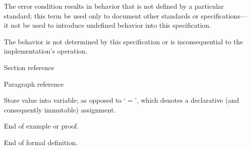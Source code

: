 \begin{description}
  The error condition results in behavior that is not defined by a particular
  standard; this term \shall be used only to document other standards or
  specifications---it \shall not be used to introduce undefined behavior into
  this specification.

  The behavior is not determined by this specification or is inconsequential to
  the implementation's operation.

  \dt{\S}
  Section reference

  \dt{\P}
  Paragraph reference

  \dt{$\leftarrow$}
  Store value into variable; as opposed to `$=$', which denotes a declarative
  (and consequently immutable) assignment.

  \dt{$\square$}
  End of example or proof.

  \dt{$\blacksquare$}
  End of formal definition.
\end{description}

\enddeptgroup
